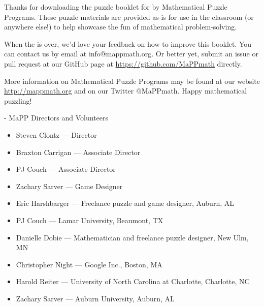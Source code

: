 
Thanks for downloading the puzzle booklet for \textbf{\phEventName} by
Mathematical Puzzle Programs.  These puzzle materials are provided as-is for use
in the classroom (or anywhere else!)  to help showcase the fun of mathematical
problem-solving.

When the \phEventName is over, we'd love your feedback on how to improve this
booklet. You can contact us by email at info@mappmath.org. Or better yet, submit
an issue or pull request at our GitHub page at \url{https://github.com/MaPPmath}
directly.

More information on Mathematical Puzzle Programs may be found at our website
\url{http://mappmath.org} and on our Twitter @MaPPmath. Happy mathematical puzzling!

- MaPP Directors and Volunteers

  \begin{itemize}
    \item Steven Clontz --- Director
    \item Braxton Carrigan --- Associate Director
    \item PJ Couch --- Associate Director
    \item Zachary Sarver --- \phEventAbbr Game Designer
  \end{itemize}

  \begin{itemize}
  \item Eric Harshbarger ---
        Freelance puzzle and game designer, Auburn, AL
  \end{itemize}

  \begin{itemize}
  \item PJ Couch ---
        Lamar University, Beaumont, TX
  \item Danielle Dobie ---
        Mathematician and freelance puzzle designer, New Ulm, MN
  \item Christopher Night ---
        Google Inc., Boston, MA
  \item Harold Reiter ---
        University of North Carolina at Charlotte, Charlotte, NC
  \item Zachary Sarver ---
        Auburn University, Auburn, AL
  \end{itemize}

